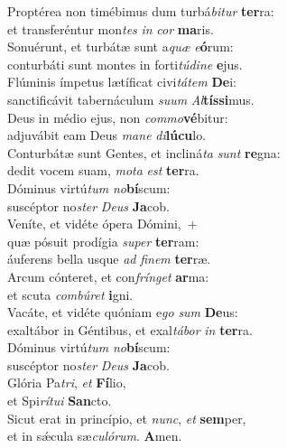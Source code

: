 \evenverse Proptérea non timébimus dum turbá\textit{bi}\textit{tur} \textbf{ter}ra:~\*\\
\evenverse et transferéntur mon\textit{tes} \textit{in} \textit{cor} \textbf{ma}ris.\\
\oddverse Sonuérunt, et turbátæ sunt a\textit{quæ} \textit{e}\textbf{ó}rum:~\*\\
\oddverse conturbáti sunt montes in forti\textit{tú}\textit{di}\textit{ne} \textbf{e}jus.\\
\evenverse Flúminis ímpetus lætíficat civi\textit{tá}\textit{tem} \textbf{De}i:~\*\\
\evenverse sanctificávit tabernáculum \textit{su}\textit{um} \textit{Al}\textbf{tís}\textbf{si}mus.\\
\oddverse Deus in médio ejus, non \textit{com}\textit{mo}\textbf{vé}bitur:~\*\\
\oddverse adjuvábit eam Deus \textit{ma}\textit{ne} \textit{di}\textbf{lú}\textbf{cu}lo.\\
\evenverse Conturbátæ sunt Gentes, et incliná\textit{ta} \textit{sunt} \textbf{re}gna:~\*\\
\evenverse dedit vocem suam, \textit{mo}\textit{ta} \textit{est} \textbf{ter}ra.\\
\oddverse Dóminus virtú\textit{tum} \textit{no}\textbf{bí}scum:~\*\\
\oddverse suscéptor no\textit{ster} \textit{De}\textit{us} \textbf{Ja}cob.\\
\evenverse Veníte, et vidéte ópera Dómini,~+\\
\evenverse  quæ pósuit prodígia \textit{su}\textit{per} \textbf{ter}ram:~\*\\
\evenverse áuferens bella usque \textit{ad} \textit{fi}\textit{nem} \textbf{ter}ræ.\\
\oddverse Arcum cónteret, et con\textit{frín}\textit{get} \textbf{ar}ma:~\*\\
\oddverse et scuta \textit{com}\textit{bú}\textit{ret} \textbf{i}gni.\\
\evenverse Vacáte, et vidéte quóniam e\textit{go} \textit{sum} \textbf{De}us:~\*\\
\evenverse exaltábor in Géntibus, et exal\textit{tá}\textit{bor} \textit{in} \textbf{ter}ra.\\
\oddverse Dóminus virtú\textit{tum} \textit{no}\textbf{bí}scum:~\*\\
\oddverse suscéptor no\textit{ster} \textit{De}\textit{us} \textbf{Ja}cob.\\
\evenverse Glória Pa\textit{tri}, \textit{et} \textbf{Fí}lio,~\*\\
\evenverse et Spi\textit{rí}\textit{tu}\textit{i} \textbf{San}cto.\\
\oddverse Sicut erat in princípio, et \textit{nunc}, \textit{et} \textbf{sem}per,~\*\\
\oddverse et in sǽcula sæ\textit{cu}\textit{ló}\textit{rum}. \textbf{A}men.\\
